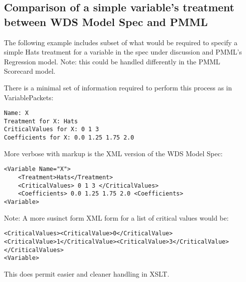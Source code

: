 \documentclass[10pt]{article}
\begin{document}
\fi

\subsection{Comparison of a simple variable's treatment between WDS Model Spec and PMML\label{hat_comparison}}

The following example includes subset of what would be required to specify a simple Hats treatment for 
a variable in the spec under discussion and PMML's Regression model.  {Note: this could be handled differently 
in the PMML Scorecard model.}

There is a minimal set of information required to perform this process as in VariablePackets:
\begin{Verbatim}[fontsize=\small,baselinestretch=0.75,formatcom=\color{red}]
Name: X
Treatment for X: Hats
CriticalValues for X: 0 1 3
Coefficients for X: 0.0 1.25 1.75 2.0
\end{Verbatim}
More verbose with markup is the XML version of the WDS Model Spec:
\begin{Verbatim}[fontsize=\small,baselinestretch=0.75,formatcom=\color{red}]
<Variable Name="X">
    <Treatment>Hats</Treatment>
    <CriticalValues> 0 1 3 </CriticalValues>
    <Coefficients> 0.0 1.25 1.75 2.0 <Coefficients>
<Variable>
\end{Verbatim}

Note: A more susinct form XML form for a list of critical values would be:
\begin{Verbatim}[fontsize=\small,baselinestretch=0.75,formatcom=\color{red}]
    <CriticalValues><CriticalValue>0</CriticalValue><CriticalValue>1</CriticalValue><CriticalValue>3</CriticalValue></CriticalValues>
<Variable>
\end{Verbatim}
This does permit easier and cleaner handling in XSLT.
\end{document}
